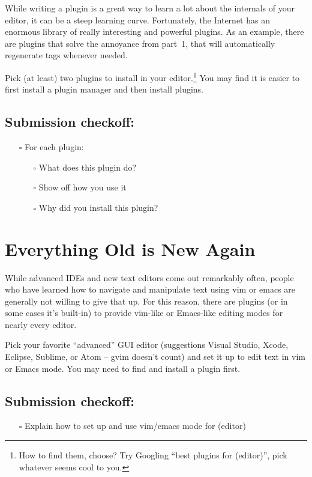 \documentclass{article}
\begin{document}
While writing a plugin is a great way to learn a lot about the internals of
your editor, it can be a steep learning curve. Fortunately, the Internet has
an enormous library of really interesting and powerful plugins.
As an example, there are plugins that solve the annoyance from part~1, that
will automatically regenerate tags whenever needed.

Pick (at least) two plugins to install in your editor.\footnote{%
  How to find them, choose? Try Googling ``best plugins for (editor)'', pick
  whatever seems cool to you.
} You may find it is easier to first install a plugin manager and then install
plugins.

\subsection*{Submission checkoff:}
\begin{itemize}
  \item[$\square$] For each plugin:
    \begin{itemize}
      \item[$\square$] What does this plugin do?
      \item[$\square$] Show off how you use it
      \item[$\square$] Why did you install this plugin?
    \end{itemize}
\end{itemize}


\section{Everything Old is New Again}

While advanced IDEs and new text editors come out remarkably often, people who
have learned how to navigate and manipulate text using vim or emacs are
generally not willing to give that up.
For this reason, there are plugins (or in some cases it's built-in) to provide
vim-like or Emacs-like editing modes for nearly every editor.

Pick your favorite ``advanced'' GUI editor (suggestions Visual Studio, Xcode,
Eclipse, Sublime, or Atom -- gvim doesn't count) and set it up to edit text in
vim or Emacs mode. You may need to find and install a plugin first.

\subsection*{Submission checkoff:}
\begin{itemize}
  \item[$\square$] Explain how to set up and use vim/emacs mode for (editor)
\end{itemize}
\end{document}
